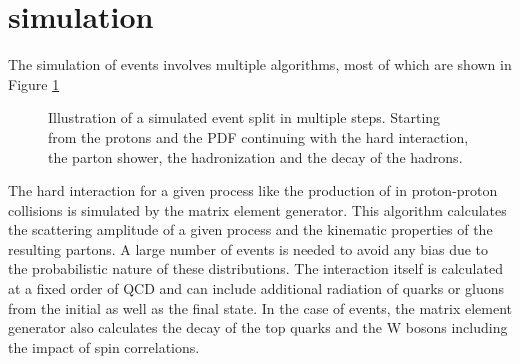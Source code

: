 \section{simulation}
\label{sec:SimReco_Sim}

The simulation of events involves multiple algorithms, most of which are shown in Figure \ref{fig:sim_struct}

\begin{figure}[htbp!]
  \begin{center}
\caption{Illustration of a simulated event split in multiple steps. Starting from the protons and the PDF continuing with the hard interaction, the parton shower, the hadronization and the decay of the hadrons\cite{Dobbs:684090}.
  \label{fig:sim_struct}}
  \end{center}
\end{figure}

The hard interaction for a given process like the production of \ttbar in proton-proton collisions is simulated by the matrix element generator.
This algorithm calculates the scattering amplitude of a given process and the kinematic properties of the resulting partons.
A large number of events is needed to avoid any bias due to the probabilistic nature of these distributions.
The interaction itself is calculated at a fixed order of QCD and can include additional radiation of quarks or gluons from the initial as well as the final state.
In the case of \ttbar events, the matrix element generator also calculates the decay of the top quarks and the W bosons including the impact of spin correlations.


